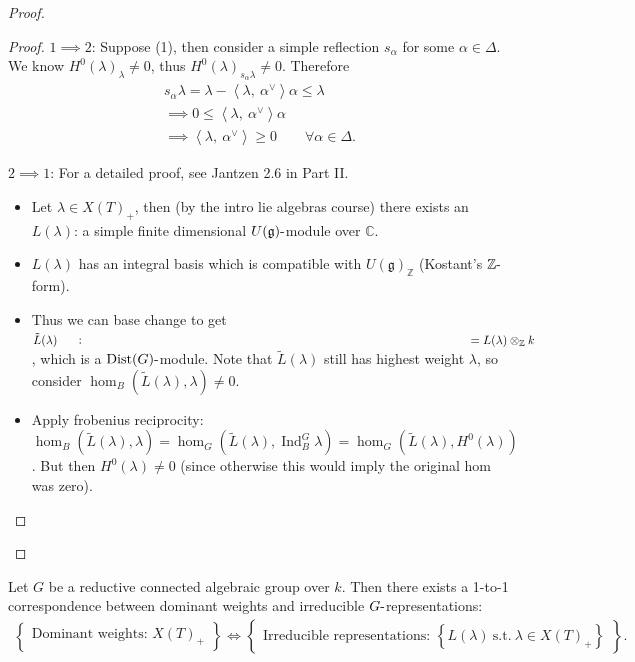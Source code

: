 \begin{proof}

\begin{proof}

\(1\implies 2\): Suppose (1), then consider a simple reflection
\(s_\alpha\) for some \(\alpha \in \Delta\). We know
\(H^0(\lambda)_\lambda \neq 0\), thus
\(H^0(\lambda)_{s_\alpha \lambda} \neq 0\). Therefore
\begin{align*}   s_\alpha \lambda = \lambda - {\left\langle {\lambda},~{\alpha^\vee} \right\rangle}\alpha \leq \lambda \\ \implies 0 \leq {\left\langle {\lambda},~{\alpha^\vee} \right\rangle}\alpha \\ \implies {\left\langle {\lambda},~{\alpha^\vee} \right\rangle} \geq 0 \qquad \forall \alpha\in \Delta .\end{align*}

\(2\implies 1\): For a detailed proof, see Jantzen 2.6 in Part II.

\begin{itemize}
\item
  Let \(\lambda \in X(T)_+\), then (by the intro lie algebras course)
  there exists an \(L(\lambda)\): a simple finite dimensional
  \(U({\mathfrak{g}}){\hbox{-}}\)module over \({\mathbb{C}}\).
\item
  \(L(\lambda)\) has an integral basis which is compatible with
  \(U({\mathfrak{g}})_{\mathbb{Z}}\) (Kostant's
  \({\mathbb{Z}}{\hbox{-}}\)form).
\item
  Thus we can base change to get
  \(\tilde L(\lambda) \mathrel{\vcenter{:}}= L(\lambda) \otimes_{\mathbb{Z}}k\),
  which is a \(\mathrm{Dist}(G){\hbox{-}}\)module. Note that
  \(\tilde L(\lambda)\) still has highest weight \(\lambda\), so
  consider \(\hom_B(\tilde L(\lambda), \lambda) \neq 0\).
\item
  Apply frobenius reciprocity:
  \(\hom_B(\tilde L(\lambda), \lambda) = \hom_G(\tilde L(\lambda), \operatorname{Ind}_B^G \lambda) = \hom_G(\tilde L(\lambda), H^0(\lambda))\).
  But then \(H^0(\lambda) \neq 0\) (since otherwise this would imply the
  original hom was zero).
\end{itemize}

\end{proof}

\end{proof}

\begin{theorem}[?]

\begin{theorem}[?]

Let \(G\) be a reductive connected algebraic group over \(k\). Then
there exists a 1-to-1 correspondence between dominant weights and
irreducible \(G{\hbox{-}}\)representations:
\begin{align*}   \left\{{\substack{\text{Dominant weights: } X(T)_+}}\right\} \iff \left\{{\substack{\text{Irreducible representations: }\left\{{L(\lambda) ~{\text{s.t.}}~\lambda \in X(T)_+}\right\} }}\right\} .\end{align*}

\end{theorem}

\end{theorem}

